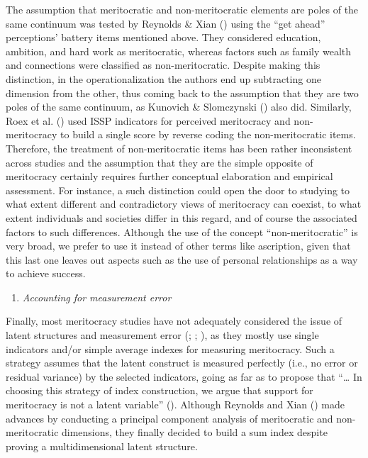 \documentclass[
  10pt,
  a4paper,
]{article}
\providecommand{\tightlist}{%
  \setlength{\itemsep}{0pt}\setlength{\parskip}{0pt}}
\begin{document}
The assumption that meritocratic and non-meritocratic elements are poles of the same continuum was tested by Reynolds \& Xian () using the ``get ahead'' perceptions' battery items mentioned above. They considered education, ambition, and hard work as meritocratic, whereas factors such as family wealth and connections were classified as non-meritocratic. Despite making this distinction, in the operationalization the authors end up subtracting one dimension from the other, thus coming back to the assumption that they are two poles of the same continuum, as Kunovich \& Slomczynski () also did. Similarly, Roex et al. () used ISSP indicators for perceived meritocracy and non-meritocracy to build a single score by reverse coding the non-meritocratic items. Therefore, the treatment of non-meritocratic items has been rather inconsistent across studies and the assumption that they are the simple opposite of meritocracy certainly requires further conceptual elaboration and empirical assessment. For instance, a such distinction could open the door to studying to what extent different and contradictory views of meritocracy can coexist, to what extent individuals and societies differ in this regard, and of course the associated factors to such differences. Although the use of the concept ``non-meritocratic'' is very broad, we prefer to use it instead of other terms like ascription, given that this last one leaves out aspects such as the use of personal relationships as a way to achieve success.

\begin{enumerate}
\def\labelenumi{\alph{enumi}.}
\setcounter{enumi}{3}
\tightlist
\item
  \emph{Accounting for measurement error}
\end{enumerate}

Finally, most meritocracy studies have not adequately considered the issue of latent structures and measurement error (; ; ), as they mostly use single indicators and/or simple average indexes for measuring meritocracy. Such a strategy assumes that the latent construct is measured perfectly (i.e., no error or residual variance) by the selected indicators, going as far as to propose that ``\ldots{} In choosing this strategy of index construction, we argue that support for meritocracy is not a latent variable'' (). Although Reynolds and Xian () made advances by conducting a principal component analysis of meritocratic and non-meritocratic dimensions, they finally decided to build a sum index despite proving a multidimensional latent structure.
\end{document}
